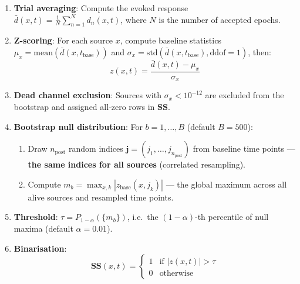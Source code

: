 \documentclass[11pt,a4paper]{article}
\begin{document}
\begin{enumerate}[leftmargin=2em]
  \item \textbf{Trial averaging}: Compute the evoked response
        $\bar{d}(x, t) = \frac{1}{N}\sum_{n=1}^{N} d_n(x, t)$, where $N$ is the number
        of accepted epochs.

  \item \textbf{Z-scoring}: For each source $x$, compute baseline statistics
        $\mu_x = \mathrm{mean}(\bar{d}(x, t_{\mathrm{base}}))$ and
        $\sigma_x = \mathrm{std}(\bar{d}(x, t_{\mathrm{base}}), \mathrm{ddof}{=}1)$, then:
        \begin{equation}
          z(x, t) = \frac{\bar{d}(x, t) - \mu_x}{\sigma_x}
          \label{eq:zscore}
        \end{equation}

  \item \textbf{Dead channel exclusion}: Sources with $\sigma_x < 10^{-12}$ are excluded
        from the bootstrap and assigned all-zero rows in $\mathbf{SS}$.

  \item \textbf{Bootstrap null distribution}: For $b = 1, \ldots, B$ (default $B = 500$):
        \begin{enumerate}[label=\alph*.]
          \item Draw $n_{\mathrm{post}}$ random indices $\mathbf{j} = (j_1, \ldots, j_{n_{\mathrm{post}}})$
                from baseline time points --- \textbf{the same indices for all sources}
                (correlated resampling).
          \item Compute $m_b = \max_{x, k} |z_{\mathrm{base}}(x, j_k)|$ --- the global maximum
                across all alive sources and resampled time points.
        \end{enumerate}

  \item \textbf{Threshold}: $\tau = P_{1-\alpha}(\{m_b\})$, i.e.\ the $(1 - \alpha)$-th
        percentile of null maxima (default $\alpha = 0.01$).

  \item \textbf{Binarisation}:
        \begin{equation}
          \mathbf{SS}(x, t) =
          \begin{cases}
            1 & \text{if } |z(x, t)| > \tau \\
            0 & \text{otherwise}
          \end{cases}
          \label{eq:ss}
        \end{equation}
\end{enumerate}
\end{document}

